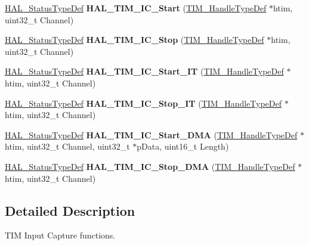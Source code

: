 \begin{DoxyCompactItemize}
\mbox{\label{group___t_i_m___exported___functions___group4_gaab393018ca6f8fad04a815feb1796ce7}} 
\mbox{\hyperlink{stm32f7xx__hal__def_8h_a63c0679d1cb8b8c684fbb0632743478f}{H\+A\+L\+\_\+\+Status\+Type\+Def}} {\bfseries H\+A\+L\+\_\+\+T\+I\+M\+\_\+\+I\+C\+\_\+\+Start} (\mbox{\hyperlink{struct_t_i_m___handle_type_def}{T\+I\+M\+\_\+\+Handle\+Type\+Def}} $\ast$htim, uint32\+\_\+t Channel)
\item 
\mbox{\label{group___t_i_m___exported___functions___group4_ga1b5edb103cb27dbd5380e9b24d12658f}} 
\mbox{\hyperlink{stm32f7xx__hal__def_8h_a63c0679d1cb8b8c684fbb0632743478f}{H\+A\+L\+\_\+\+Status\+Type\+Def}} {\bfseries H\+A\+L\+\_\+\+T\+I\+M\+\_\+\+I\+C\+\_\+\+Stop} (\mbox{\hyperlink{struct_t_i_m___handle_type_def}{T\+I\+M\+\_\+\+Handle\+Type\+Def}} $\ast$htim, uint32\+\_\+t Channel)
\item 
\mbox{\label{group___t_i_m___exported___functions___group4_gac0e3515f374ec6b9d30609cd683649d6}} 
\mbox{\hyperlink{stm32f7xx__hal__def_8h_a63c0679d1cb8b8c684fbb0632743478f}{H\+A\+L\+\_\+\+Status\+Type\+Def}} {\bfseries H\+A\+L\+\_\+\+T\+I\+M\+\_\+\+I\+C\+\_\+\+Start\+\_\+\+IT} (\mbox{\hyperlink{struct_t_i_m___handle_type_def}{T\+I\+M\+\_\+\+Handle\+Type\+Def}} $\ast$htim, uint32\+\_\+t Channel)
\item 
\mbox{\label{group___t_i_m___exported___functions___group4_gaf5664e207667c99ef50378813056e5f6}} 
\mbox{\hyperlink{stm32f7xx__hal__def_8h_a63c0679d1cb8b8c684fbb0632743478f}{H\+A\+L\+\_\+\+Status\+Type\+Def}} {\bfseries H\+A\+L\+\_\+\+T\+I\+M\+\_\+\+I\+C\+\_\+\+Stop\+\_\+\+IT} (\mbox{\hyperlink{struct_t_i_m___handle_type_def}{T\+I\+M\+\_\+\+Handle\+Type\+Def}} $\ast$htim, uint32\+\_\+t Channel)
\item 
\mbox{\label{group___t_i_m___exported___functions___group4_gac3b7deffff43a8bdc3e2eea42115efff}} 
\mbox{\hyperlink{stm32f7xx__hal__def_8h_a63c0679d1cb8b8c684fbb0632743478f}{H\+A\+L\+\_\+\+Status\+Type\+Def}} {\bfseries H\+A\+L\+\_\+\+T\+I\+M\+\_\+\+I\+C\+\_\+\+Start\+\_\+\+D\+MA} (\mbox{\hyperlink{struct_t_i_m___handle_type_def}{T\+I\+M\+\_\+\+Handle\+Type\+Def}} $\ast$htim, uint32\+\_\+t Channel, uint32\+\_\+t $\ast$p\+Data, uint16\+\_\+t Length)
\item 
\mbox{\label{group___t_i_m___exported___functions___group4_ga8e7dc17f058ef9c826774436d68f80b5}} 
\mbox{\hyperlink{stm32f7xx__hal__def_8h_a63c0679d1cb8b8c684fbb0632743478f}{H\+A\+L\+\_\+\+Status\+Type\+Def}} {\bfseries H\+A\+L\+\_\+\+T\+I\+M\+\_\+\+I\+C\+\_\+\+Stop\+\_\+\+D\+MA} (\mbox{\hyperlink{struct_t_i_m___handle_type_def}{T\+I\+M\+\_\+\+Handle\+Type\+Def}} $\ast$htim, uint32\+\_\+t Channel)
\end{DoxyCompactItemize}


\subsection{Detailed Description}
T\+IM Input Capture functions. 

